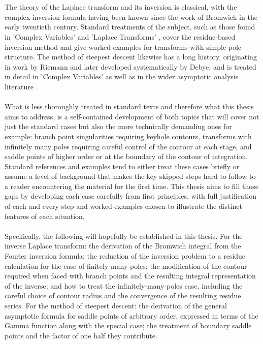 \\
\\
The theory of the Laplace transform and its inversion is classical, with the complex inversion formula having been known since the work of Bromwich in the early twentieth century. Standard treatments of the subject, such as those found in 'Complex Variables' \cite{RedBook} and 'Laplace Transforms' \cite{TransformsTheory}, cover the residue-based inversion method and give worked examples for transforms with simple pole structure. The method of steepest descent likewise has a long history, originating in work by Riemann and later developed systematically by Debye, and is treated in detail in 'Complex Variables' as well as in the wider asymptotic analysis literature \cite{Asymptotic, Steepestdescent,Steepestorigin}.
\\
\\
What is less thoroughly treated in standard texts and therefore what this thesis aims to address, is a self-contained development of both topics that will cover not just the standard cases but also the more technically demanding ones for example: branch point singularities requiring keyhole contours, transforms with infinitely many poles requiring careful control of the contour at each stage, and saddle points of higher order or at the boundary of the contour of integration. Standard references and examples tend to either treat these cases briefly or assume a level of background that makes the key skipped steps hard to follow to a reader encountering the material for the first time. This thesis aims to fill those gaps by developing each case carefully from first principles, with full justification of each and every step and worked examples chosen to illustrate the distinct features of each situation.
\\
\\
Specifically, the following will hopefully be established in this thesis. For the inverse Laplace transform: the derivation of the Bromwich integral from the Fourier inversion formula; the reduction of the inversion problem to a residue calculation for the case of finitely many poles; the modification of the contour required when faced with branch points and the resulting integral representation of the inverse; and how to treat the infinitely-many-poles case, including the careful choice of contour radius and the convergence of the resulting residue series. For the method of steepest descent: the derivation of the general asymptotic formula for saddle points of arbitrary order, expressed in terms of the Gamma function along with the special case; the treatment of boundary saddle points and the factor of one half they contribute.
